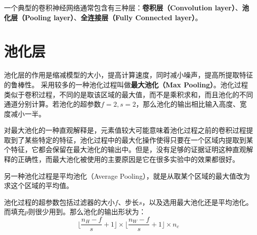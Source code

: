 \documentclass[../../main.tex]{subfiles}
\begin{document}
一个典型的卷积神经网络通常包含有三种层：\textbf{卷积层（Convolution layer）}、\textbf{池化层（Pooling layer）}、\textbf{全连接层（Fully Connected layer）}。

\section{池化层}
池化层的作用是缩减模型的大小，提高计算速度，同时减小噪声，提高所提取特征的鲁棒性。
采用较多的一种池化过程叫做\textbf{最大池化（Max Pooling）}。池化过程类似于卷积过程，不同的是取该区域的最大值，而不是乘积求和，而且池化的不同通道分别计算。若池化的超参数\(f=2, s=2\)，那么池化的输出相比输入高度、宽度减小一半。

对最大池化的一种直观解释是，元素值较大可能意味着池化过程之前的卷积过程提取到了某些特定的特征，池化过程中的最大化操作使得只要在一个区域内提取到某个特征，它都会保留在最大池化的输出中。但是，没有足够的证据证明这种直观解释的正确性，而最大池化被使用的主要原因是它在很多实验中的效果都很好。

另一种池化过程是平均池化（Average Pooling），就是从取某个区域的最大值改为求这个区域的平均值。

池化过程的超参数包括过滤器的大小\(f\)、步长\(s\)，以及选用最大池化还是平均池化。而填充\(p\)则很少用到。那么池化的输出形状为：\[
    \biggl\lfloor \frac{n_H-f}{s}+1   \biggr\rfloor \times \biggl\lfloor \frac{n_W-f}{s}+1   \biggr\rfloor \times n_c
\]
\end{document}

